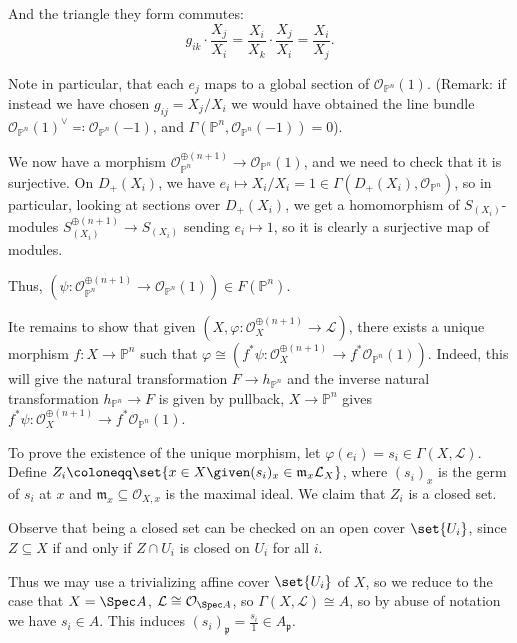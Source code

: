 And the triangle they form commutes:
\[ g_{ik}\cdot \frac{X_j}{X_i} = \frac{X_i}{X_k}\cdot \frac{X_j}{X_i} = \frac{X_i}{X_j}. \]

Note in particular, that each $e_j$ maps to a global section of $\mathcal{O}_{\mathbb{P}^n}(1)$.
(Remark: if instead we have chosen $g_{ij} = X_j/X_i$ we would have obtained the line bundle
$\mathcal{O}_{\mathbb{P}^n}(1)^\vee \eqqcolon \mathcal{O}_{\mathbb{P}^n}(-1)$, and
$\Gamma(\mathbb{P}^n, \mathcal{O}_{\mathbb{P}^n}(-1)) = 0$).

We now have a morphism $\mathcal{O}_{\mathbb{P}^n}^{\oplus(n+1)} \to \mathcal{O}_{\mathbb{P}^n}(1)$,
and we need to check that it is surjective.  On $D_+(X_i)$, we have
$e_i\mapsto X_i/X_i = 1 \in\Gamma(D_+(X_i), \mathcal{O}_{\mathbb{P}^n})$, so in
particular, looking at sections over $D_+(X_i)$, we get a homomorphism of
$S_{(X_i)}$-modules $S_{(X_i)}^{\oplus(n+1)}\to S_{(X_i)}$ sending
$e_i\mapsto 1$, so it is clearly a surjective map of modules.

Thus, $(\psi\colon \mathcal{O}_{\mathbb{P}^n}^{\oplus(n+1)}\to \mathcal{O}_{\mathbb{P}^n}(1)) \in F(\mathbb{P}^n)$.

Ite remains to show that given $(X, \varphi\colon \mathcal{O}_X^{\oplus(n+1)}\to \mathcal{L})$,
there exists a unique morphism $f\colon X\to \mathbb{P}^n$ such that $\varphi\cong (f^*\psi\colon \mathcal{O}_X^{\oplus(n+1)}\to f^*\mathcal{O}_{\mathbb{P}^n}(1))$.
Indeed, this will give the natural transformation $F\to h_{\mathbb{P}^n}$ and the
inverse natural transformation $h_{\mathbb{P}^n}\to F$ is given by pullback,
$X\to \mathbb{P}^n$ gives $f^*\psi\colon \mathcal{O}_X^{\oplus(n+1)}\to f^*\mathcal{O}_{\mathbb{P}^n}(1)$.

To prove the existence of the unique morphism, let $\varphi(e_i) = s_i \in\Gamma(X, \mathcal{L})$.
Define $Z_i \coloneqq \set{x \in X\given (s_i)_x \in \mathfrak{m}_x \mathcal{L}_X}$,
where $(s_i)_x$ is the germ of $s_i$ at $x$ and $\mathfrak{m}_x \subseteq \mathcal{O}_{X, x}$
is the maximal ideal. We claim that $Z_i$ is a closed set.

Observe that being a closed set can be checked on an open cover $\set{U_i}$, since
$Z \subseteq X$ if and only if $Z\cap U_i$ is closed on $U_i$ for all $i$.

Thus we may use a trivializing affine cover $\set{U_i}$ of $X$, so we reduce to the
case that $X = \Spec A$, $\mathcal{L} \cong \mathcal{O}_{\Spec A}$, so $\Gamma(X, \mathcal{L})\cong A$,
so by abuse of notation we have $s_i \in A$. This induces $(s_i)_{\mathfrak{p}} = \frac{s_i}{1} \in A_{\mathfrak{p}}$.

